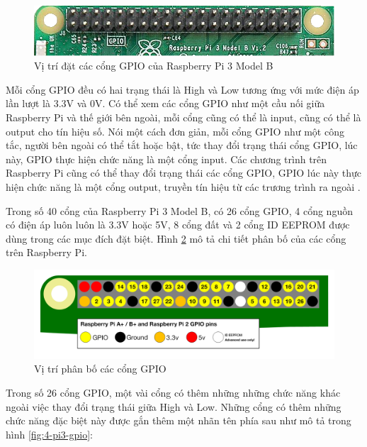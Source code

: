 \documentclass[12pt,a4paper,oneside]{extbook}
\begin{document}
\begin{figure}[h]
  \centering
     \includegraphics[scale=0.7]{4-vi-tri-dat-gpio}
  \caption{Vị trí đặt các cổng GPIO của Raspberry Pi 3 Model B}\label{fig:4-vi-tri-dat-gpio}
\end{figure}

Mỗi cổng GPIO đều có hai trạng thái là High và Low tương ứng với mức điện áp lần lượt là 3.3V và 0V. Có thể xem các cổng GPIO như một cầu nối giữa Raspberry Pi và thế giới bên ngoài, mỗi cổng cũng có thể là input, cũng có thể là output cho tín hiệu số. Nói một cách đơn giản, mỗi cổng GPIO như một công tắc, người bên ngoài có thể tắt hoặc bật, tức thay đổi trạng thái cổng GPIO, lúc này, GPIO thực hiện chức năng là một cổng input. Các chương trình trên Raspberry Pi cũng có thể thay đổi trạng thái các cổng GPIO, GPIO lúc này thực hiện chức năng là một cổng output, truyền tín hiệu từ các trương trình ra ngoài \cite{raspberry-gpio}.

Trong số 40 cổng của Raspberry Pi 3 Model B, có 26 cổng GPIO, 4 cổng nguồn có điện áp luôn luôn là 3.3V hoặc 5V, 8 cổng đất và 2 cổng ID EEPROM được dùng trong các mục đích đặt biệt. Hình \ref{fig:4-vi-tri-phan-bo-gpio} mô tả chi tiết phân bố của các cổng trên Raspberry Pi.

\begin{figure}[h]
  \centering
     \includegraphics[scale=0.3]{4-vi-tri-phan-bo-gpio}
  \caption{Vị trí phân bố các cổng GPIO}\label{fig:4-vi-tri-phan-bo-gpio}
\end{figure}

Trong số 26 cổng GPIO, một vài cổng có thêm những những chức năng khác ngoài việc thay đổi trạng thái giữa High và Low. Những cổng có thêm những chức năng đặc biệt này được gắn thêm một nhãn tên phía sau như mô tả trong hình \ref{fig:4-pi3-gpio}: 
\end{document}
